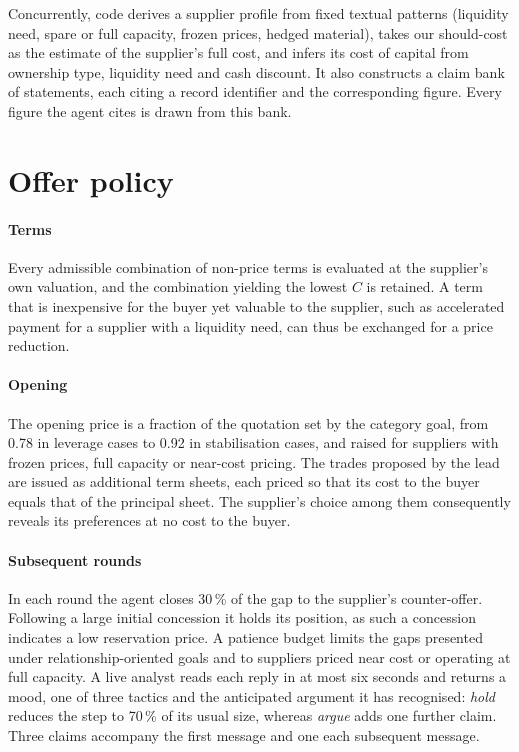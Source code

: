 \documentclass[10pt,a4paper,twocolumn]{article}
\newcommand{\C}{\ensuremath{C}}
\begin{document}
Concurrently, code derives a supplier profile from fixed textual patterns (liquidity need, spare or full capacity, frozen prices, hedged material), takes our should-cost as the estimate of the supplier's full cost, and infers its cost of capital from ownership type, liquidity need and cash discount. It also constructs a claim bank of statements, each
citing a record identifier and the corresponding figure. Every figure the agent cites is drawn from this bank.

\section{Offer policy}

\paragraph{Terms} Every admissible combination of non-price terms is evaluated at the supplier's
own valuation, and the combination yielding the lowest \C{} is retained. A term that is
inexpensive for the buyer yet valuable to the supplier, such as accelerated payment for a
supplier with a liquidity need, can thus be exchanged for a price reduction.

\paragraph{Opening} The opening price is a fraction of the quotation set by the category goal, from 0.78 in leverage cases to 0.92 in stabilisation cases, and raised for suppliers with frozen prices, full capacity or near-cost pricing. The trades proposed by
the lead are issued as additional term sheets, each priced so that its cost to the buyer equals
that of the principal sheet. The supplier's choice among them consequently reveals its
preferences at no cost to the buyer.

\paragraph{Subsequent rounds} In each round the agent closes 30\,\% of the gap to the supplier's
counter-offer. Following a large initial concession it holds its position, as such a concession
indicates a low reservation price. A patience budget limits the gaps presented under relationship-oriented goals and to suppliers priced near cost or operating at full capacity. A live analyst reads each reply in at most six seconds and returns a mood, one of three tactics and the anticipated argument it has
recognised: \emph{hold} reduces the step to 70\,\% of its usual size, whereas \emph{argue} adds
one further claim. Three claims accompany the first message and one each subsequent message.
\end{document}
